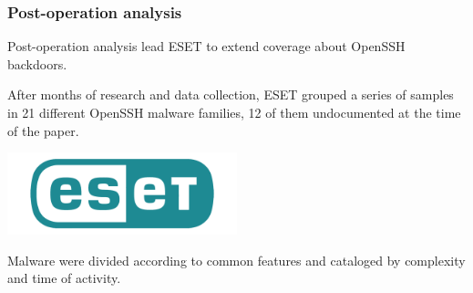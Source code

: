 \begin{frame}
	\frametitle{Post-operation analysis}
	
	Post-operation analysis lead ESET to extend coverage about OpenSSH backdoors.
	
	\smallskip

	After months of research and data collection, ESET grouped a series of samples in 21 different OpenSSH malware families, 12 of them undocumented at the time of the paper. 
	
	\begin{center}    
  \includegraphics[width=0.5\textwidth]{images/eset-logo}
  \end{center}

	\smallskip

  Malware were divided according to common features and cataloged by complexity and time of activity.  
	
\end{frame}

